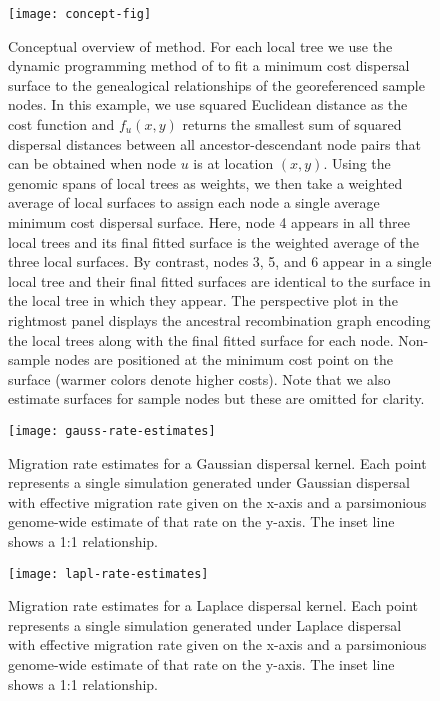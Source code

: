 \begin{figure}[ht]
\centering
\texttt{[image: concept-fig]}
\caption{Conceptual overview of method. For each local tree we use the dynamic
programming method of \citet{Sankoff_Rousseau_1975} to fit a minimum cost
dispersal surface to the genealogical relationships of the georeferenced sample
nodes. In this example, we use squared Euclidean distance as the cost function 
and $f_u(x,y)$ returns the smallest sum of squared dispersal distances between 
all ancestor-descendant node pairs that can be obtained when node $u$ is at 
location $(x,y)$. Using the genomic spans of local trees as weights, we then 
take a weighted average of local surfaces to assign each node a single average 
minimum cost dispersal surface. Here, node 4 appears in all three 
local trees and its final fitted surface is the weighted average of the three 
local surfaces. By contrast, nodes 3, 5, and 6 appear in a single local tree 
and their final fitted surfaces are identical to the surface in the local tree 
in which they appear. The perspective plot in the rightmost panel displays the
ancestral recombination graph encoding the local trees along with the final 
fitted surface for each node. Non-sample nodes are positioned at the minimum cost 
point on the surface (warmer colors denote higher costs). Note that we also 
estimate surfaces for sample nodes but these are omitted for clarity. 
}
\label{fig:concept-fig}
\end{figure}

\begin{figure}[ht]
\centering
\texttt{[image: gauss-rate-estimates]}
\caption{Migration rate estimates for a Gaussian dispersal kernel. Each point
represents a single simulation generated under Gaussian dispersal with effective
migration rate given on the x-axis and a parsimonious genome-wide estimate of that
rate on the y-axis. The inset line shows a 1:1 relationship.
}
\label{fig:gauss-rate-estimates}
\end{figure}

\begin{figure}[ht]
\centering
\texttt{[image: lapl-rate-estimates]}
\caption{Migration rate estimates for a Laplace dispersal kernel. Each point
represents a single simulation generated under Laplace dispersal with effective
migration rate given on the x-axis and a parsimonious genome-wide estimate of
that rate on the y-axis. The inset line shows a 1:1 relationship.
}
\label{fig:lapl-rate-estimates}
\end{figure}

